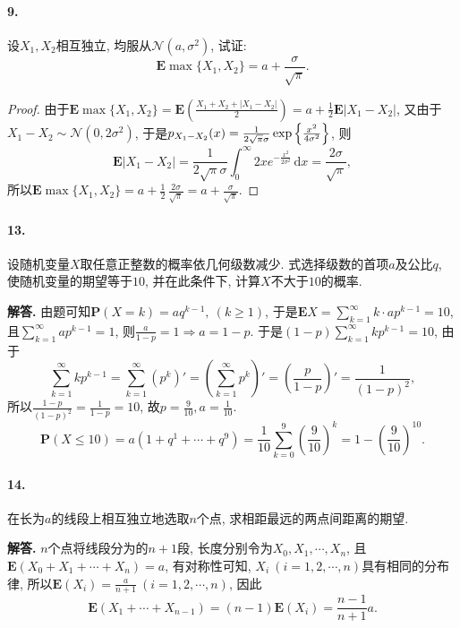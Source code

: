 \documentclass[12pt, a4paper, oneside]{ctexart}
\newenvironment{solution}{\par\noindent\textbf{解答. }}{\bigskip\par}
\let\leq=\leqslant %
\let\geq=\geqslant %
\def\d{\mathrm{d}}      %
\def\P{\textbf{P}}      %
\def\E{\textbf{E}}      %
\def\del{\vspace{-3.5ex}}  %
\begin{document}
\paragraph{9.}设$X_1,X_2$相互独立, 均服从$\mathcal{N}(a, \sigma^2)$, 试证:
\begin{equation*}
    \E\max\{X_1, X_2\} = a+\frac{\sigma}{\sqrt{\pi}}.
\end{equation*}
\begin{proof}
    由于$\E \max\{X_1,X_2\} = \E\left(\frac{X_1+X_2+|X_1-X_2|}{2}\right) = a + \frac{1}{2}\E|X_1-X_2|$, 又由于$X_1-X_2\sim\mathcal{N}(0,2\sigma^2)$, 于是$p_{X_1-X_2}(x)=  \frac{1}{2\sqrt{\pi}\sigma}\exp\left\{\-\frac{x^2}{4\sigma^2}\right\}$, 则
    \begin{equation*}
        \E|X_1-X_2| = \frac{1}{2\sqrt{\pi}\sigma}\int_0^{\infty}2xe^{-\frac{x^2}{2\sigma^2}}\,\d x = \frac{2\sigma}{\sqrt{\pi}},
    \end{equation*}
    所以$\E\max\{X_1,X_2\} = a+\frac{1}{2}\,\frac{2\sigma}{\sqrt{\pi}} = a+\frac{\sigma}{\sqrt{\pi}}$.
\end{proof}
\paragraph{13.}设随机变量$X$取任意正整数的概率依几何级数减少. 式选择级数的首项$a$及公比$q$, 使随机变量的期望等于$10$, 并在此条件下, 计算$X$不大于$10$的概率.
\begin{solution}
    由题可知$\P(X=k) = aq^{k-1},\ (k\geq 1)$, 于是$\E X = \sum_{k=1}^\infty k\cdot ap^{k-1} = 10$, 且$\sum_{k=1}^\infty ap^{k-1} = 1$, 则$\frac{a}{1-p} = 1\Rightarrow a= 1-p$. 于是$(1-p)\sum_{k=1}^\infty kp^{k-1} = 10$, 由于
    \begin{equation*}
        \sum_{k=1}^\infty kp^{k-1} = \sum_{k=1}^\infty(p^k)' = \left(\sum_{k=1}^\infty p^k\right)' = \left(\frac{p}{1-p}\right)' = \frac{1}{(1-p)^2},
    \end{equation*}
    所以$\frac{1-p}{(1-p)^2}=\frac{1}{1-p} = 10$, 故$p = \frac{9}{10}, a = \frac{1}{10}$.
    \begin{equation*}
        \P(X\leq 10) = a(1+q^1+\cdots + q^9) = \frac{1}{10}\sum_{k=0}^9(\frac{9}{10})^k = 1-\left(\frac{9}{10}\right)^{10}.
    \end{equation*}
\end{solution}\del
\paragraph{14.}在长为$a$的线段上相互独立地选取$n$个点, 求相距最远的两点间距离的期望.
\begin{solution}
    $n$个点将线段分为的$n+1$段, 长度分别令为$X_0, X_1,\cdots, X_n$, 且$\E(X_0+X_1+\cdots+X_n) = a$, 有对称性可知, $X_i\ (i=1,2,\cdots, n)$具有相同的分布律, 所以$\E(X_i) = \frac{a}{n+1}\ (i=1,2,\cdots, n)$, 因此
    \begin{equation*}
        \E(X_1+\cdots+X_{n-1}) = (n-1)\E(X_i) = \frac{n-1}{n+1}a.
    \end{equation*}
\end{solution}\del
\end{document}
